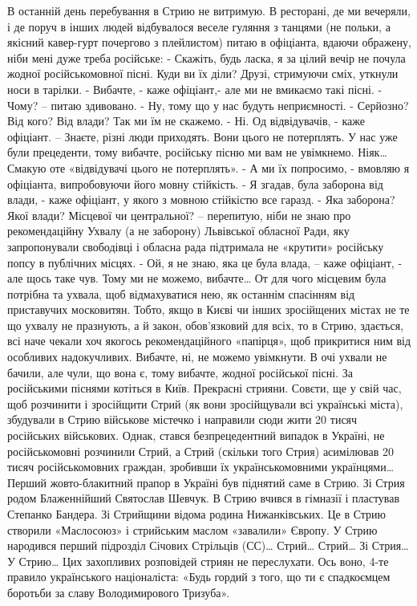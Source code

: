 В останній день перебування в Стрию не витримую. В ресторані, де ми вечеряли, і де поруч в інших людей відбувалося веселе гуляння з танцями (не польки, а якісний кавер-гурт почергово з  плейлистом) питаю в офіціанта, вдаючи ображену, ніби мені дуже треба російське: 
- Скажіть, будь ласка, я за цілий вечір не почула жодної російськомовної пісні. Куди ви їх діли?
Друзі, стримуючи сміх, уткнули носи в тарілки.
- Вибачте, - каже офіціант,- але ми не вмикаємо такі пісні.
- Чому? – питаю здивовано.
- Ну, тому що у нас будуть неприємності. 
- Серйозно? Від кого? Від влади? Так ми їм не скажемо.
- Ні. Од відвідувачів, - каже офіціант. – Знаєте, різні люди приходять. Вони цього не потерплять. У нас уже були прецеденти, тому вибачте, російську пісню ми вам не увімкнемо. Ніяк… 
Смакую оте «відвідувачі цього не потерплять». 
- А ми їх попросимо, - вмовляю я офіціанта, випробовуючи його мовну стійкість.
- Я згадав, була заборона від влади, - каже офіціант, у якого з мовною стійкістю все гаразд.
- Яка заборона? Якої влади? Місцевої чи центральної? – перепитую, ніби не знаю про рекомендаційну Ухвалу (а не заборону) Львівської  обласної Ради, яку запропонували свободівці і обласна рада підтримала не «крутити» російську попсу в публічних місцях. 
- Ой, я не знаю, яка це була влада, – каже офіціант, - але щось таке чув. Тому ми не можемо, вибачте…
От для чого місцевим була потрібна та ухвала, щоб відмахуватися нею, як останнім спасінням від приставучих московитян.  Тобто, якщо в Києві чи інших зросійщених містах не те що ухвалу не празнують, а й закон, обов’язковий для всіх, то в Стрию, здається, всі наче чекали хоч якогось рекомендаційного «папірця», щоб прикритися ним від особливих надокучливих. Вибачте, ні, не можемо увімкнути. В очі ухвали не бачили, але чули, що вона є, тому вибачте, жодної російської пісні. За російськими піснями котіться в Київ.
Прекрасні стрияни. Совєти, ще у свій час, щоб розчинити і зросійщити Стрий (як вони зросійщували всі українські міста), збудували в Стрию військове містечко і направили сюди жити 20 тисяч російських військових. Однак, стався безпрецедентний випадок в Україні, не російськомовні розчинили Стрий, а Стрий (скільки того Стрия) асимілював 20 тисяч російськомовних граждан, зробивши їх українськомовними українцями…  
Перший жовто-блакитний прапор в Україні був піднятий саме в Стрию. Зі Стрия родом Блаженнійший Святослав Шевчук. В Стрию вчився в гімназії і пластував Степанко Бандера. Зі Стрийщини відома родина Нижанківських. Це в Стрию створили «Маслосоюз» і стрийським маслом «завалили» Європу. У Стрию народився перший підрозділ Січових Стрільців (СС)… Стрий… Стрий… Зі Стрия… У Стрию… Цих захопливих розповідей стриян не переслухати. Ось воно, 4-те правило українського націоналіста: «Будь гордий з того, що ти є спадкоємцем боротьби за славу Володимирового Тризуба».
